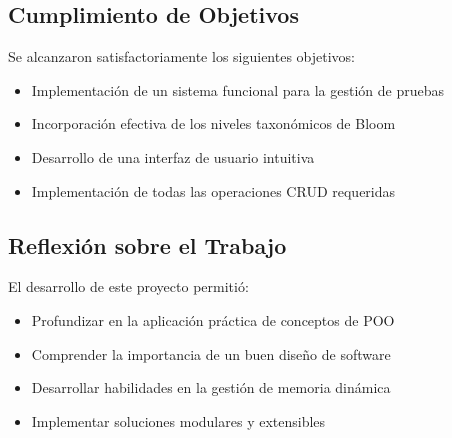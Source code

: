 \documentclass[12pt]{article}
\begin{document}
\subsection{Cumplimiento de Objetivos}
Se alcanzaron satisfactoriamente los siguientes objetivos:
\begin{itemize}
    \item Implementaci\'on de un sistema funcional para la gesti\'on de pruebas
    \item Incorporaci\'on efectiva de los niveles taxon\'omicos de Bloom
    \item Desarrollo de una interfaz de usuario intuitiva
    \item Implementaci\'on de todas las operaciones CRUD requeridas
\end{itemize}

\subsection{Reflexi\'on sobre el Trabajo}
El desarrollo de este proyecto permiti\'o:
\begin{itemize}
    \item Profundizar en la aplicaci\'on pr\'actica de conceptos de POO
    \item Comprender la importancia de un buen dise\~no de software
    \item Desarrollar habilidades en la gesti\'on de memoria din\'amica
    \item Implementar soluciones modulares y extensibles
\end{itemize}
\end{document}
